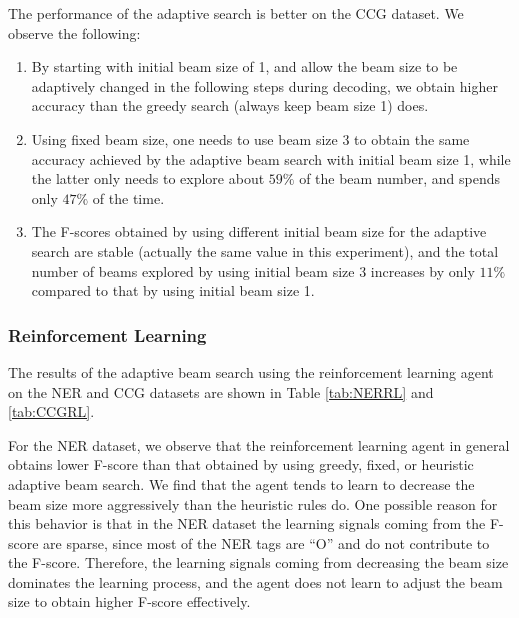 \documentclass[11pt,a4paper]{article}
\begin{document}
The performance of the adaptive search is better on the CCG dataset. We observe the following:
\begin{enumerate}
\item By starting with initial beam size of 1, and allow the beam size to be adaptively changed in the following steps during decoding, we obtain higher accuracy than the greedy search (always keep beam size 1) does.
\item Using fixed beam size, one needs to use beam size 3 to obtain the same accuracy achieved by the adaptive beam search with initial beam size 1, while the latter only needs to explore about $59\%$ of the beam number, and spends only $47\%$ of the time.
\item The F-scores obtained by using different initial beam size for the adaptive search are stable (actually the same value in this experiment), and the total number of beams explored by using initial beam size 3 increases by only $11\%$ compared to that by using initial beam size 1.
\end{enumerate}



\subsubsection{Reinforcement Learning}

The results of the adaptive beam search using the reinforcement learning agent on the NER and CCG datasets are shown in Table \ref{tab:NERRL} and \ref{tab:CCGRL}.

For the NER dataset, we observe that the reinforcement learning agent in general obtains lower F-score than that obtained by using greedy, fixed, or heuristic adaptive beam search. We find that the agent tends to learn to decrease the beam size more aggressively than the heuristic rules do. One possible reason for this behavior is that in the NER dataset the learning signals coming from the F-score are sparse, since most of the NER tags are ``O'' and do not contribute to the F-score. Therefore, the learning signals coming from decreasing the beam size dominates the learning process, and the agent does not learn to adjust the beam size to obtain higher F-score effectively.
\end{document}

